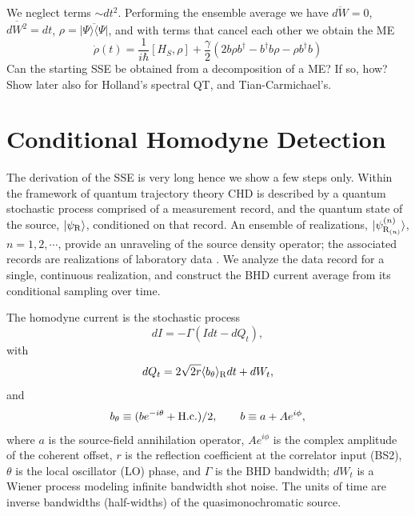 \documentclass[twocolumn,aps,eqsecnum,showkeys,amsmath]{revtex4}
\providecommand{\vxp}[1]{\langle #1 \rangle}
\providecommand{\ket}[1]{\lvert #1 \rangle}
\begin{document}
\begin{widetext}
We neglect terms $\sim dt^2$. Performing the ensemble average we have 
$\overline{dW}=0$, $\overline{dW^2}=dt$, 
$\rho= \overline{|\Psi\rangle\langle\Psi|}$, and with terms that 
cancel each other we obtain the ME 
%
\begin{equation}
\dot{\rho}(t) = \frac{1}{i\hbar} [H_S, \rho] 
+\frac{\gamma}{2} ( 2b\rho b^\dag -b^\dag b \rho -\rho b^\dag b ) 
						\label{ME-RF}
\end{equation}
Can the starting SSE be obtained from a decomposition of a ME? 
If so, how? Show later also for Holland's spectral QT, and 
Tian-Carmichael's.

\end{widetext}

\section{Conditional Homodyne Detection}
The derivation of the SSE is very long hence we show a few steps only. Within the framework of quantum trajectory theory CHD is described by a quantum stochastic process comprised of a measurement record, and the quantum state of the source, 
$\ket{\psi_{\rm R}}$, conditioned on that record. An ensemble of realizations, 
$\ket{\psi_{{\rm R}_{(n)}}^{(n)} }$, $n=1,2,\cdots$, provide an unraveling of the 
source density operator; the associated records are realizations of laboratory data \cite{CCFO00,FOCC00}. We analyze the data record for a single, continuous 
realization, and construct the BHD current average from its conditional sampling 
over time.

The homodyne current is the stochastic process
%
\begin{equation} 	\label{eqn:current} 
dI = - \Gamma(Idt-dQ_t),
\end{equation}
with
%
\begin{equation}
dQ_t = 2 \sqrt{2r} \vxp{b_\theta}_{\rm R} dt +dW_t,
\end{equation}
and
%
\begin{equation}
 b_\theta \equiv ( b e^{-i\theta} +{\rm H.c.})/2, 	\qquad
	 b\equiv a+Ae^{i\phi},
\end{equation}
where $a$ is the source-field annihilation operator, $Ae^{i\phi}$ 
is the complex amplitude of the coherent offset, $r$ is the reflection
coefficient at the correlator input (BS2), $\theta$ is the local 
oscillator (LO) phase, and $\Gamma$ is the BHD bandwidth; $dW_t$ is a 
Wiener process modeling infinite bandwidth shot noise. The units of 
time are inverse bandwidths (half-widths) of the quasimonochromatic 
source.
\end{document}
